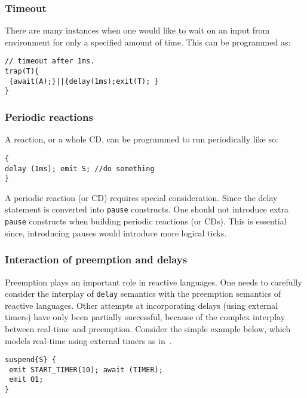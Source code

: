 \subsubsection{Timeout}
\label{sec:timeout}

There are many instances when one would like to wait on an input from
environment for only a specified amount of time. This can be programmed
as:
    \begin{scriptsize}
\begin{verbatim}
// timeout after 1ms.
trap(T){
 {await(A);}||{delay(1ms);exit(T); }
}
\end{verbatim}
    \end{scriptsize}

\subsubsection{Periodic reactions}
\label{sec:periodic-reactions}

A reaction, or a whole CD, can be programmed to run periodically like
so:

\begin{scriptsize}
  
\begin{verbatim}
{
delay (1ms); emit S; //do something
}
\end{verbatim}
\end{scriptsize}
A periodic reaction (or CD) requires special consideration. Since the
delay statement is converted into \texttt{pause} constructs. One should
not introduce extra \texttt{pause} constructs when building periodic
reactions (or CDs). This is essential since, introducing pauses would
introduce more logical ticks.

\subsubsection{Interaction of preemption and delays}
\label{sec:inter-preempt-delays}

Preemption plays an important role in reactive languages. One needs to
carefully consider the interplay of \texttt{delay} semantics with the
preemption semantics of reactive languages. Other attempts at
incorporating delays (using external timers) have only been partially
successful, because of the complex interplay between real-time and
preemption. Consider the simple example below, which models real-time
using external timers as in~\cite{rsh94}.

\begin{scriptsize}
  
\begin{verbatim}
suspend{S} {
 emit START_TIMER(10); await (TIMER); 
 emit O1;
}
\end{verbatim}
\end{scriptsize}

